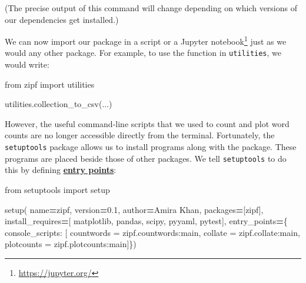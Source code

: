 \documentclass[
]{krantz}
\makeatletter
\newenvironment{Shaded}{\begin{snugshade}}{\end{snugshade}}
\newcommand{\ImportTok}[1]{#1}
\newcommand{\NormalTok}[1]{#1}
\newcommand{\OperatorTok}[1]{\textcolor[rgb]{0.81,0.36,0.00}{\textbf{#1}}}
\newcommand{\StringTok}[1]{\textcolor[rgb]{0.31,0.60,0.02}{#1}}
\renewcommand{\href}[2]{#2\footnote{\url{#1}}}
\newenvironment{kframe}{%
\medskip{}
\setlength{\fboxsep}{.8em}
 \def\at@end@of@kframe{}%
 \ifinner\ifhmode%
  \def\at@end@of@kframe{\end{minipage}}%
  \begin{minipage}{\columnwidth}%
 \fi\fi%
 \def\FrameCommand##1{\hskip\@totalleftmargin \hskip-\fboxsep
 \colorbox{shadecolor}{##1}\hskip-\fboxsep
     \hskip-\linewidth \hskip-\@totalleftmargin \hskip\columnwidth}%
 \MakeFramed {\advance\hsize-\width
   \@totalleftmargin\z@ \linewidth\hsize
   \@setminipage}}%
 {\par\unskip\endMakeFramed%
 \at@end@of@kframe}
\renewenvironment{Shaded}{\begin{kframe}}{\end{kframe}}
\newcommand{\gref}[2]{\hyperlink{#2}{\textbf{#1}}}
\makeatother
\begin{document}
(The precise output of this command will change
depending on which versions of our dependencies get installed.)

We can now import our package in a script or a \href{https://jupyter.org/}{Jupyter notebook}
just as we would any other package.
For example,
to use the function in \texttt{utilities},
we would write:

\begin{Shaded}
\begin{Highlighting}[]
\ImportTok{from}\NormalTok{ zipf }\ImportTok{import}\NormalTok{ utilities}


\NormalTok{utilities.collection\_to\_csv(...)}
\end{Highlighting}
\end{Shaded}

However,
the useful command-line scripts that we used to count and plot word counts
are no longer accessible directly from the terminal.
Fortunately,
the \texttt{setuptools} package allows us to install programs along with the package.
These programs are placed beside those of other packages.
We tell \texttt{setuptools} to do this by defining
\gref{entry points}{entry\_point}:

\begin{Shaded}
\begin{Highlighting}[]
\ImportTok{from}\NormalTok{ setuptools }\ImportTok{import}\NormalTok{ setup}


\NormalTok{setup(}
\NormalTok{    name}\OperatorTok{=}\StringTok{\textquotesingle{}zipf\textquotesingle{}}\NormalTok{,}
\NormalTok{    version}\OperatorTok{=}\StringTok{\textquotesingle{}0.1\textquotesingle{}}\NormalTok{,}
\NormalTok{    author}\OperatorTok{=}\StringTok{\textquotesingle{}Amira Khan\textquotesingle{}}\NormalTok{,}
\NormalTok{    packages}\OperatorTok{=}\NormalTok{[}\StringTok{\textquotesingle{}zipf\textquotesingle{}}\NormalTok{],}
\NormalTok{    install\_requires}\OperatorTok{=}\NormalTok{[}
        \StringTok{\textquotesingle{}matplotlib\textquotesingle{}}\NormalTok{,}
        \StringTok{\textquotesingle{}pandas\textquotesingle{}}\NormalTok{,}
        \StringTok{\textquotesingle{}scipy\textquotesingle{}}\NormalTok{,}
        \StringTok{\textquotesingle{}pyyaml\textquotesingle{}}\NormalTok{,}
        \StringTok{\textquotesingle{}pytest\textquotesingle{}}\NormalTok{],}
\NormalTok{    entry\_points}\OperatorTok{=}\NormalTok{\{}
        \StringTok{\textquotesingle{}console\_scripts\textquotesingle{}}\NormalTok{: [}
            \StringTok{\textquotesingle{}countwords = zipf.countwords:main\textquotesingle{}}\NormalTok{,}
            \StringTok{\textquotesingle{}collate = zipf.collate:main\textquotesingle{}}\NormalTok{,}
            \StringTok{\textquotesingle{}plotcounts = zipf.plotcounts:main\textquotesingle{}}\NormalTok{]\})}
\end{Highlighting}
\end{Shaded}
\end{document}
